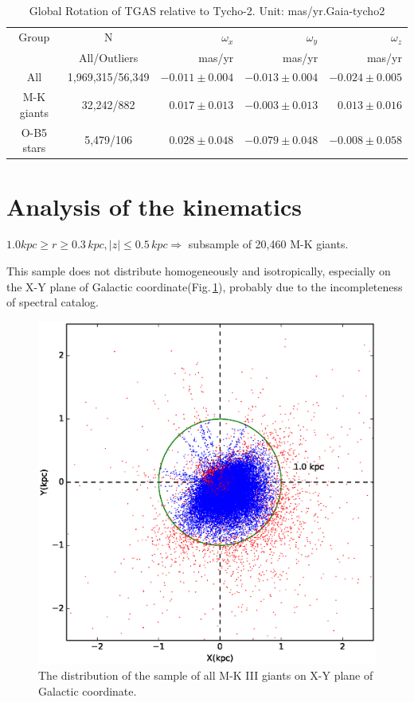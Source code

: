 \documentclass[onecolumn]{aa}   %
\begin{document}
\begin{table}[ht]
\caption{Global Rotation of TGAS relative to Tycho-2. Unit: mas/yr.Gaia-tycho2}
\centering
\begin{tabular}{c c r r r }
\hline
Group  		&   N    			&  $\omega_x$      	 		& $\omega_y$         			& $\omega_z$ \\
			&  All/Outliers      	&mas/yr                        		& mas/yr                 			&mas/yr   \\
\hline
All          		& 1,969,315/56,349	&$-0.011 \pm 0.004$    &$-0.013 \pm 0.004$    &$-0.024 \pm 0.005$ \\
M-K giants	& 32,242/882		&$ 0.017 \pm 0.013$    &$-0.003 \pm 0.013$    &$ 0.013 \pm 0.016$ \\
O-B5 stars   	& 5,479/106		&$ 0.028 \pm 0.048$    &$-0.079 \pm 0.048$    &$-0.008 \pm 0.058$ \\
\hline
\end{tabular}
\label{tab:spin}
\end{table}

\section{Analysis of the kinematics} \label{sec:kinamatics}

$1.0kpc \ge r \ge 0.3\, kpc, \mid z \mid \le 0.5\, kpc  \Rightarrow $ subsample of 20,460 M-K giants. 

This sample does not distribute homogeneously and isotropically, especially on the X-Y plane of Galactic coordinate(Fig.\,\ref{fig: XY_mk}), probably due to the incompleteness of spectral catalog. 

\begin{figure}[hbtp]
  \centering
  \includegraphics[width=0.5\columnwidth]{figures/XY_mk.eps}  %
  \caption[]{\label{fig: XY_mk}
  The distribution of the sample of all M-K III giants on X-Y plane of Galactic coordinate.
  }
 \end{figure}
  
\end{document}
